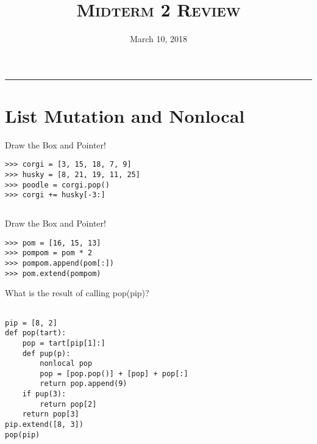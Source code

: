 \documentclass{exam}
\title{\textsc{Midterm 2 Review}}
\date{March 10, 2018}
\begin{document}
\maketitle
\rule{\textwidth}{0.15em}
\fontsize{12}{15}\selectfont




\section{List Mutation and Nonlocal}
\begin{questions}

\item Draw the Box and Pointer!
\newline
\begin{lstlisting}
>>> corgi = [3, 15, 18, 7, 9]
>>> husky = [8, 21, 19, 11, 25]
>>> poodle = corgi.pop()
>>> corgi += husky[-3:]
\end{lstlisting}
\begin{solution}
\begin{lstlisting}

\end{lstlisting}
\end{solution}
\vspace{4cm}

\item Draw the Box and Pointer!

\begin{lstlisting}
>>> pom = [16, 15, 13]
>>> pompom = pom * 2
>>> pompom.append(pom[:])
>>> pom.extend(pompom)
\end{lstlisting}

\clearpage
\vspace{4cm}
\item What is the result of calling pop(pip)?

\begin{lstlisting}

pip = [8, 2]
def pop(tart):
    pop = tart[pip[1]:]
    def pup(p):
        nonlocal pop
        pop = [pop.pop()] + [pop] + pop[:] 
        return pop.append(9)
    if pup(3):
        return pop[2]
    return pop[3]
pip.extend([8, 3])
pop(pip)
\end{lstlisting}

\end{questions}
\clearpage
\end{document}
